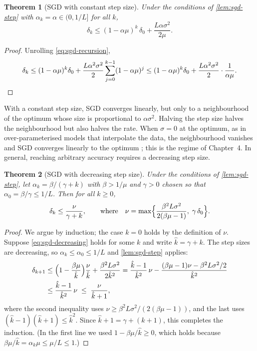 \documentclass[11pt,a4paper,oneside]{report}
\theoremstyle{plain}
\newtheorem{theorem}{Theorem}[chapter]
\theoremstyle{definition}
\theoremstyle{remark}
\begin{document}
\begin{theorem}[SGD with constant step size]\label{thm:sgd-constant}
Under the conditions of \cref{lem:sgd-step} with $\alpha_k = \alpha\in(0, 1/L]$ for all $k$,
\begin{equation}\label{eq:sgd-constant}
  \delta_k \le (1 - \alpha\mu)^k\,\delta_0 + \frac{L\alpha\sigma^2}{2\mu}.
\end{equation}
\end{theorem}

\begin{proof}
Unrolling \eqref{eq:sgd-recursion},
\[
  \delta_k \le (1 - \alpha\mu)^k\delta_0 + \frac{L\alpha^2\sigma^2}{2}\sum_{j=0}^{k-1}(1 - \alpha\mu)^j
  \le (1 - \alpha\mu)^k\delta_0 + \frac{L\alpha^2\sigma^2}{2}\cdot\frac{1}{\alpha\mu}. \qedhere
\]
\end{proof}

With a constant step size, SGD converges linearly, but only to a neighbourhood of the optimum whose size is proportional to $\alpha\sigma^2$. Halving the step size halves the neighbourhood but also halves the rate. When $\sigma = 0$ at the optimum, as in over-parameterised models that interpolate the data, the neighbourhood vanishes and SGD converges linearly to the optimum \citep{vaswani2019,gower2019}; this is the regime of Chapter~4. In general, reaching arbitrary accuracy requires a decreasing step size.

\begin{theorem}[SGD with decreasing step size]\label{thm:sgd-decreasing}
Under the conditions of \cref{lem:sgd-step}, let $\alpha_k = \beta/(\gamma + k)$ with $\beta > 1/\mu$ and $\gamma > 0$ chosen so that $\alpha_0 = \beta/\gamma \le 1/L$. Then for all $k\ge0$,
\begin{equation}\label{eq:sgd-decreasing}
  \delta_k \le \frac{\nu}{\gamma + k}, \qquad\text{where}\quad
  \nu = \max\Bigl\{\frac{\beta^2 L\sigma^2}{2(\beta\mu - 1)},\; \gamma\,\delta_0\Bigr\}.
\end{equation}
\end{theorem}

\begin{proof}
We argue by induction; the case $k = 0$ holds by the definition of $\nu$. Suppose \eqref{eq:sgd-decreasing} holds for some $k$ and write $\hat{k} = \gamma + k$. The step sizes are decreasing, so $\alpha_k\le\alpha_0\le1/L$ and \cref{lem:sgd-step} applies:
\begin{align*}
  \delta_{k+1}
  &\le \Bigl(1 - \frac{\beta\mu}{\hat{k}}\Bigr)\frac{\nu}{\hat{k}} + \frac{\beta^2 L\sigma^2}{2\hat{k}^2}
   = \frac{\hat{k} - 1}{\hat{k}^2}\,\nu - \frac{(\beta\mu - 1)\nu - \beta^2 L\sigma^2/2}{\hat{k}^2} \\
  &\le \frac{\hat{k} - 1}{\hat{k}^2}\,\nu
   \;\le\; \frac{\nu}{\hat{k} + 1},
\end{align*}
where the second inequality uses $\nu\ge\beta^2L\sigma^2/(2(\beta\mu - 1))$, and the last uses $(\hat{k} - 1)(\hat{k} + 1)\le\hat{k}^2$. Since $\hat{k} + 1 = \gamma + (k+1)$, this completes the induction. (In the first line we used $1 - \beta\mu/\hat{k}\ge 0$, which holds because $\beta\mu/\hat{k} = \alpha_k\mu\le\mu/L\le1$.)
\end{proof}
\end{document}
